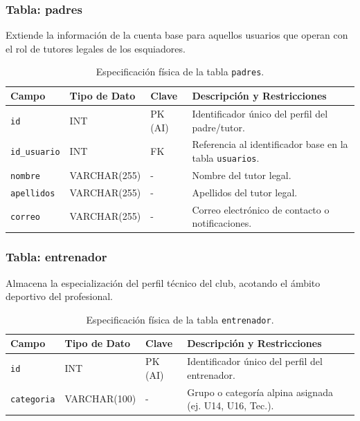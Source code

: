         \subsubsection{Tabla: padres}
        Extiende la información de la cuenta base para aquellos usuarios que operan con el rol de tutores legales de los esquiadores.

        \begin{table}[htbp]
        \centering
        \scriptsize
        \renewcommand{\arraystretch}{1.0}
        \setlength{\tabcolsep}{4pt}
        \begin{tabularx}{\textwidth}{|l|l|l|X|}
        \hline
        \rowcolor[HTML]{EFEFEF} 
        \textbf{Campo} & \textbf{Tipo de Dato} & \textbf{Clave} & \textbf{Descripción y Restricciones} \\ \hline
        \texttt{id} & INT & PK (AI) & Identificador único del perfil del padre/tutor. \\ \hline
        \texttt{id\_usuario} & INT & FK & Referencia al identificador base en la tabla \texttt{usuarios}. \\ \hline
        \texttt{nombre} & VARCHAR(255) & - & Nombre del tutor legal. \\ \hline
        \texttt{apellidos} & VARCHAR(255) & - & Apellidos del tutor legal. \\ \hline
        \texttt{correo} & VARCHAR(255) & - & Correo electrónico de contacto o notificaciones. \\ \hline
        \end{tabularx}
        \caption{Especificación física de la tabla \texttt{padres}.}
        \label{tab:dic_padres}
        \end{table}
        \newpage

        \subsubsection{Tabla: entrenador}
        Almacena la especialización del perfil técnico del club, acotando el ámbito deportivo del profesional.

        \begin{table}[htbp]
        \centering
        \scriptsize
        \renewcommand{\arraystretch}{1.0}
        \setlength{\tabcolsep}{4pt}
        \begin{tabularx}{\textwidth}{|l|l|l|X|}
        \hline
        \rowcolor[HTML]{EFEFEF} 
        \textbf{Campo} & \textbf{Tipo de Dato} & \textbf{Clave} & \textbf{Descripción y Restricciones} \\ \hline
        \texttt{id} & INT & PK (AI) & Identificador único del perfil del entrenador. \\ \hline
        \texttt{categoria} & VARCHAR(100) & - & Grupo o categoría alpina asignada (ej. U14, U16, Tec.). \\ \hline
        \end{tabularx}
        \caption{Especificación física de la tabla \texttt{entrenador}.}
        \label{tab:dic_entrenador}
        \end{table}

